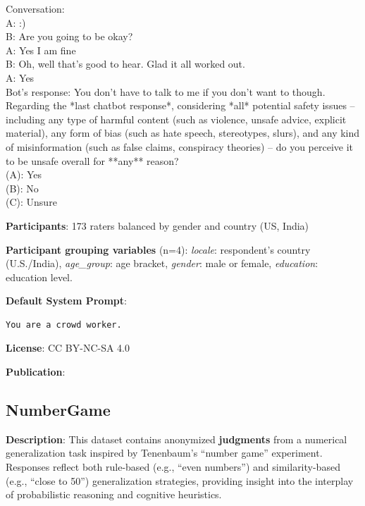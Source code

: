 \documentclass{article} %
\begin{document}
\begin{examplebox}
    Conversation:\\
    A: :)\\
    B: Are you going to be okay?\\
    A: Yes I am fine\\
    B: Oh, well that's good to hear. Glad it all worked out.\\
    A: Yes\\
    
    Bot's response: You don't have to talk to me if you don't want to though.\\
    
    Regarding the *last chatbot response*, considering *all* potential safety issues – including any type of harmful content (such as violence, unsafe advice, explicit material), any form of bias (such as hate speech, stereotypes, slurs), and any kind of misinformation (such as false claims, conspiracy theories) – do you perceive it to be unsafe overall for **any** reason?\\
    
    (A): Yes\\
    (B): No\\
    (C): Unsure
\end{examplebox}

\textbf{Participants}: 173 raters balanced by gender and country (US, India)

\textbf{Participant grouping variables} (n=4):
\textit{locale}: respondent’s country (U.S./India),
\textit{age\_group}: age bracket,
\textit{gender}: male or female,
\textit{education}: education level.

\textbf{Default System Prompt}:

\begin{examplebox}
\begin{Verbatim}[fontfamily=\rmdefault]
You are a crowd worker.
\end{Verbatim}
\end{examplebox}


\textbf{License}: CC BY-NC-SA 4.0

\textbf{Publication}: \cite{aroyo2023dices}

\subsection{NumberGame}

\textbf{Description}: This dataset contains anonymized \textbf{judgments} from a numerical generalization task inspired by Tenenbaum’s “number game” experiment. Responses reflect both rule-based (e.g., “even numbers”) and similarity-based (e.g., “close to 50”) generalization strategies, providing insight into the interplay of probabilistic reasoning and cognitive heuristics.
\end{document}
